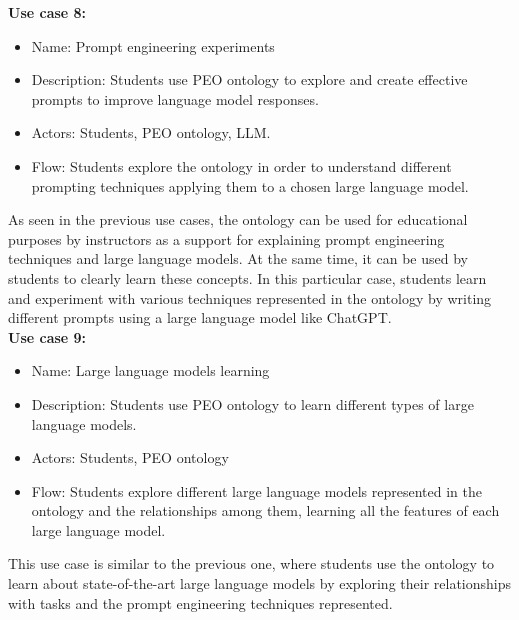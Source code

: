\textbf{Use case 8:}
\begin{itemize}
    \item Name: Prompt engineering experiments
    \item Description: Students use PEO ontology to explore and create effective prompts to improve language model responses.
    \item Actors: Students, PEO ontology, LLM.
    \item Flow: Students explore the ontology in order to understand different prompting techniques applying them to a chosen large language model.
\end{itemize}
As seen in the previous use cases, the ontology can be used for educational purposes by instructors as a support for explaining prompt engineering techniques and large language models. At the same time, it can be used by students to clearly learn these concepts. In this particular case, students learn and experiment with various techniques represented in the ontology by writing different prompts using a large language model like ChatGPT.\\

\textbf{Use case 9:}
\begin{itemize}
    \item Name: Large language models learning
    \item Description: Students use PEO ontology to learn different types of large language models.
    \item Actors: Students, PEO ontology
    \item Flow: Students explore different large language models represented in the ontology and the relationships among them, learning all the features of each large language model.
\end{itemize}
This use case is similar to the previous one, where students use the ontology to learn about state-of-the-art large language models by exploring their relationships with tasks and the prompt engineering techniques represented.\\

